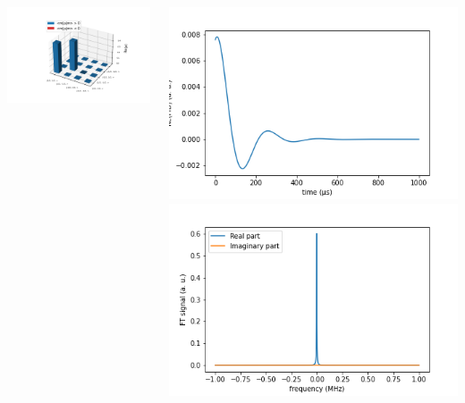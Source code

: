 \documentclass[10pt]{beamer}
\begin{document}
\begin{frame}
\begin{columns}[T]
\begin{column}{.5\textwidth}
\begin{column}{.5\textwidth}
	\includegraphics[width=1.5\textwidth]{simulation_results/spin1-2/11uncorrelated_mixed_no_interactions/EvolvedRealPartDensityMatrix.png}
\end{column}
    \end{column}
    \begin{column}{.5\textwidth}
	\includegraphics[width=\textwidth]{simulation_results/spin1-2/11uncorrelated_mixed_no_interactions/FIDSignal.png}
	\includegraphics[width=\textwidth]{simulation_results/spin1-2/11uncorrelated_mixed_no_interactions/FTSignal.png}
    \end{column}
  \end{columns}
\end{frame}
\end{document}
